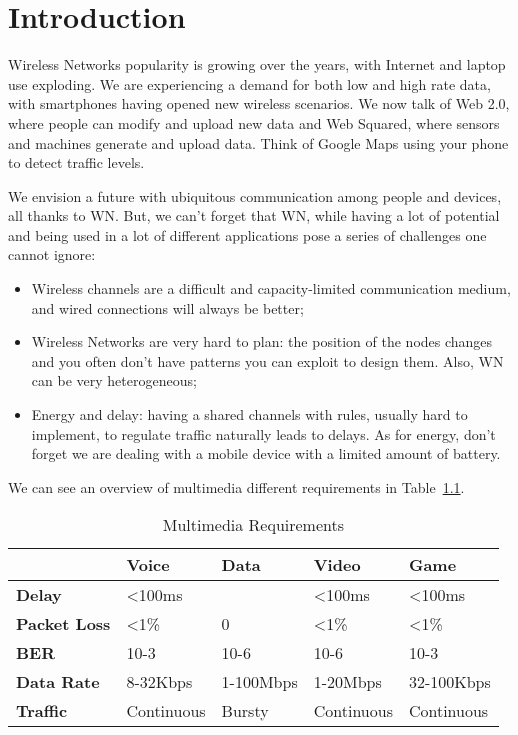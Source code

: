\chapter{Introduction}
Wireless Networks popularity is growing over the years, with Internet 
and laptop use exploding. We are experiencing a demand for both low and high 
rate data, with smartphones having opened new wireless scenarios. We now talk of 
Web 2.0, where people can modify and upload new data and Web Squared, where 
sensors and machines generate and upload data. Think of Google Maps using your 
phone to detect traffic levels.
	
We envision a future with ubiquitous communication among people and 
devices, all thanks to WN. But, we can't forget that WN, while having a lot of 
potential and being used in a lot of different applications pose a series of 
challenges one cannot ignore:
	 
\begin{itemize}
\item Wireless channels are a difficult and capacity-limited 
  communication medium, and wired connections will always be better;
\item Wireless Networks are very hard to plan: the position of 
  the nodes changes and you often don't have patterns you can exploit to design 
  them. Also, WN can be very heterogeneous;
\item Energy and delay: having a shared channels with rules, 
  usually hard to implement, to regulate traffic naturally leads to delays. As
  for energy, don't forget we are dealing with a mobile device with a limited
  amount of battery.
\end{itemize}

We can see an overview of multimedia different requirements in 
Table~\ref{tab:intro:mmreq}.

\begin{table}[t]
\centering
\begin{tabular}{l|l|l|l|l|}
\cline{2-5}
                     & \textbf{Voice} & \textbf{Data} & \textbf{Video} & \textbf{Game}  \\ \hline 
\textbf{Delay}       & \textless100ms &               & \textless100ms & \textless100ms \\ \hline
\textbf{Packet Loss} & \textless1\%   & 0             & \textless1\%   & \textless1\%   \\ \hline
\textbf{BER}         & 10-3           & 10-6          & 10-6           & 10-3           \\ \hline
\textbf{Data Rate}   & 8-32Kbps       & 1-100Mbps     & 1-20Mbps       & 32-100Kbps     \\ \hline
\textbf{Traffic}     & Continuous     & Bursty        & Continuous     & Continuous     \\ \hline
\end{tabular}
\caption{Multimedia Requirements}
\label{tab:intro:mmreq}
\end{table}

